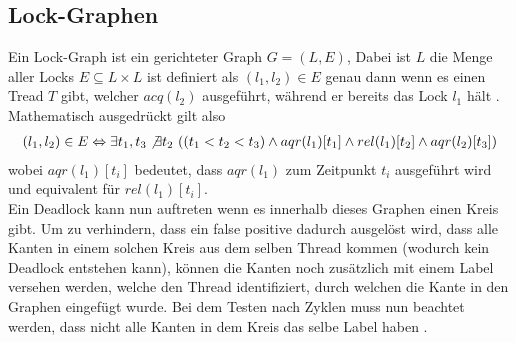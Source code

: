 \subsection{Lock-Graphen}
Ein Lock-Graph ist ein gerichteter Graph $G = (L, E)$, Dabei ist $L$ die Menge aller Locks $E \subseteq L \times L$ ist definiert als $(l_1, l_2) \in E$ genau dann wenn es einen Tread $T$ gibt, welcher $acq(l_2)$ ausgeführt, während er bereits das Lock $l_1$ hält \cite{bensalem}. Mathematisch ausgedrückt gilt also 
\begin{align*}
    (l_1, l_2) \in E \Leftrightarrow \exists t_1, t_3 \not\exists t_2\ ((t_1 < t_2 < t_3) \land aqr(l_1)[t_1] \land rel(l_1)[t_2] \land  aqr(l_2)[t_3])
\end{align*}
wobei $aqr(l_1)[t_i]$ bedeutet, dass $aqr(l_1)$ zum Zeitpunkt $t_i$ ausgeführt wird und equivalent für $rel(l_1)[t_i]$.\\
Ein Deadlock kann nun auftreten wenn es innerhalb dieses Graphen einen Kreis gibt. Um zu verhindern, dass ein false positive dadurch ausgelöst wird, dass alle Kanten in einem solchen Kreis aus dem selben Thread kommen (wodurch kein Deadlock entstehen kann), können die Kanten noch zusätzlich mit einem Label versehen werden, welche den Thread identifiziert, durch welchen die Kante in den Graphen eingefügt wurde. Bei dem Testen nach Zyklen muss nun beachtet werden, dass nicht alle Kanten in dem Kreis das selbe Label haben \cite{bensalem}. 
